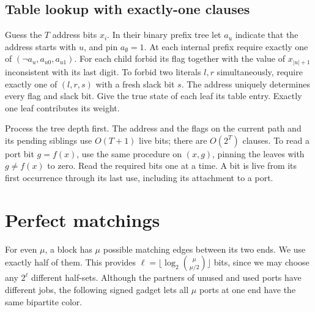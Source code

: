 \documentclass[11pt]{article}
\theoremstyle{definition}
\begin{document}
\subsection{Table lookup with exactly-one clauses}\label{sec:lookup}

Guess the \(T\) address bits \(x_i\). In their binary prefix tree let \(a_u\) indicate that the address starts with \(u\), and pin \(a_\emptyset=1\). At each internal prefix require exactly one of \((\neg a_u,a_{u0},a_{u1})\). For each child forbid its flag together with the value of \(x_{|u|+1}\) inconsistent with its last digit. To forbid two literals \(l,r\) simultaneously, require exactly one of \((l,r,s)\) with a fresh slack bit \(s\). The address uniquely determines every flag and slack bit. Give the true state of each leaf its table entry. Exactly one leaf contributes its weight.

Process the tree depth first. The address and the flags on the current path and its pending siblings use \(O(T+1)\) live bits; there are \(O(2^T)\) clauses. To read a port bit \(g=f(x)\), use the same procedure on \((x,g)\), pinning the leaves with \(g\ne f(x)\) to zero. Read the required bits one at a time. A bit is live from its first occurrence through its last use, including its attachment to a port.

\section{Perfect matchings}\label{sec:per-encoding}

For even \(\mu\), a block has \(\mu\) possible matching edges between its two ends. We use exactly half of them. This provides \(\ell=\lfloor\log_2\binom \mu{\mu/2}\rfloor\) bits, since we may choose any \(2^\ell\) different half-sets. Although the partners of unused and used ports have different jobs, the following signed gadget lets all \(\mu\) ports at one end have the same bipartite color.
\end{document}
